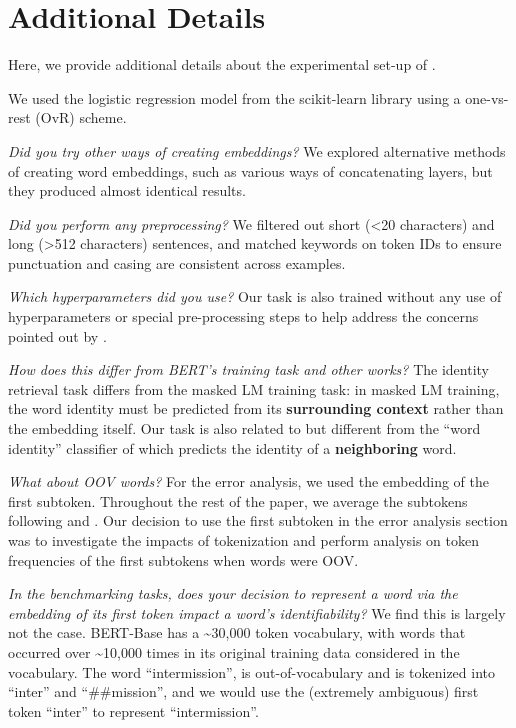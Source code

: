 \section{Additional Details}
\label{section:appendix_identity_probe}

Here, we provide additional details about the experimental set-up of \wc.

We used the logistic regression model from the scikit-learn library using a one-vs-rest (OvR) scheme.

\textit{Did you try other ways of creating embeddings?}
We explored alternative methods of creating word embeddings, such as various ways of concatenating layers, but they produced almost identical results. 

\textit{Did you perform any preprocessing?}
We filtered out short (<20 characters) and long (>512 characters) sentences, and matched keywords on token IDs to ensure punctuation and casing are consistent across examples.

\textit{Which hyperparameters did you use?}
Our task is also trained without any use of hyperparameters or special pre-processing steps to help address the concerns pointed out by \citet{liu-etal-2019-linguistic, hewitt-liang-2019-designing}.

\textit{How does this differ from BERT's training task and other works?}
The identity retrieval task differs from the masked LM training task: in masked LM training, the  word identity must be predicted from its \textbf{surrounding context} rather than the embedding itself. Our task is also related to but different from  the ``word identity'' classifier of \citet{zhang-bowman-2018-language} which predicts the identity of a \textbf{neighboring} word.

\textit{What about OOV words?}
\label{section:OOV}
For the error analysis, we used the embedding of the first subtoken. Throughout the rest of the paper, we average the subtokens following \citet{pilehvar-camacho-collados-2019-wic} and \citet{blevins-zettlemoyer-2020-moving}. Our decision to use the first subtoken in the error analysis section was to investigate the impacts of tokenization and perform analysis on token frequencies of the first subtokens when words were OOV.

\textit{In the benchmarking tasks, does your decision to represent a word via the embedding of its first token impact a word’s identifiability?} 
We find this is largely not the case. BERT-Base has a \textasciitilde30,000 token vocabulary, with words that occurred over \textasciitilde10,000 times in its original training data considered in the vocabulary. The word “intermission”, is out-of-vocabulary and is tokenized into “inter” and “\#\#mission”, and we would use the (extremely ambiguous) first token “inter” to represent “intermission”. 

